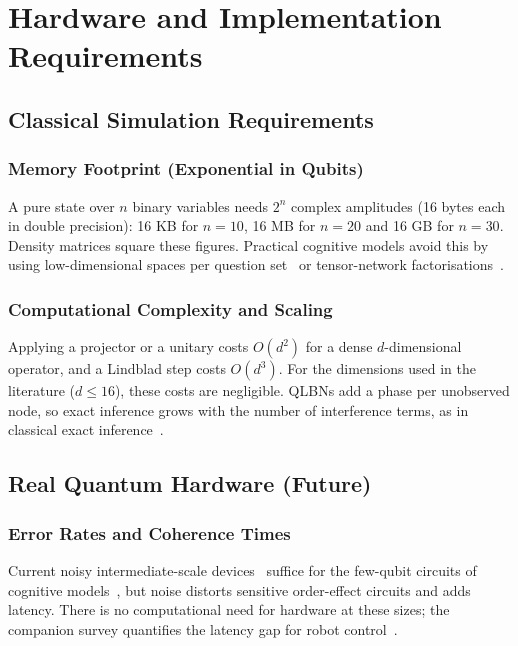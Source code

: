 \documentclass[pdflatex,sn-basic]{sn-jnl}
\begin{document}
\section{Hardware and Implementation Requirements}\label{sec:hw}

\subsection{Classical Simulation Requirements}

\subsubsection{Memory Footprint (Exponential in Qubits)}
A pure state over $n$ binary variables needs $2^n$ complex amplitudes (16 bytes each in double precision): 16 KB for $n = 10$, 16 MB for $n = 20$ and 16 GB for $n = 30$. Density matrices square these figures. Practical cognitive models avoid this by using low-dimensional spaces per question set~\citep{Busemeyer2018} or tensor-network factorisations~\citep{Stoudenmire2016}.

\subsubsection{Computational Complexity and Scaling}
Applying a projector or a unitary costs $O(d^2)$ for a dense $d$-dimensional operator, and a Lindblad step costs $O(d^3)$. For the dimensions used in the literature ($d \leq 16$), these costs are negligible. QLBNs add a phase per unobserved node, so exact inference grows with the number of interference terms, as in classical exact inference~\citep{Moreira2014}.

\subsection{Real Quantum Hardware (Future)}

\subsubsection{Error Rates and Coherence Times}
Current noisy intermediate-scale devices~\citep{Preskill2018} suffice for the few-qubit circuits of cognitive models~\citep{Widdows2023}, but noise distorts sensitive order-effect circuits and adds latency. There is no computational need for hardware at these sizes; the companion survey quantifies the latency gap for robot control~\citep{Guru2026}.
\end{document}
